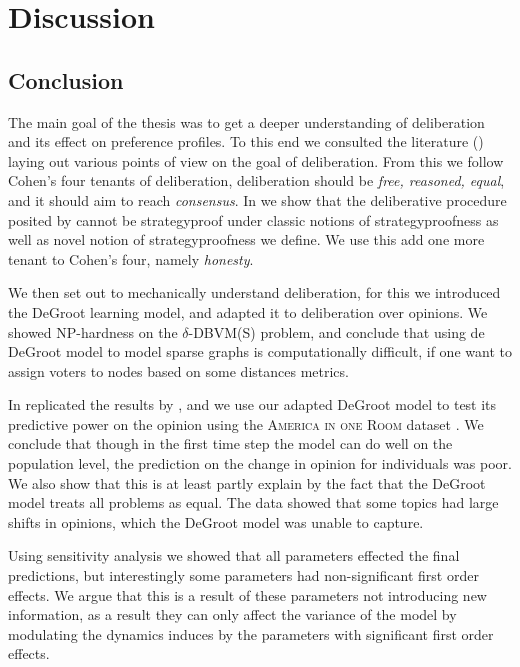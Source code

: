 \newpage
\chapter{Discussion}
\label{Discussion}

\section{Conclusion}

The main goal of the thesis was to get a deeper understanding of deliberation
and its effect on preference profiles. To this end we consulted the literature
() laying out various points of view on the goal of
deliberation. From this we follow Cohen's
\cite{cohenDeliberationDemocraticLegimitimacy2002} four tenants of
deliberation, deliberation should be \textit{free, reasoned, equal}, and  it
should aim to reach \textit{consensus}. In  we show that the
deliberative procedure posited by
\citet{radDeliberationSinglePeakednessCoherent2021} cannot be strategyproof
under classic notions of strategyproofness as well as novel notion of
strategyproofness we define. We use this add one more tenant to Cohen's four,
namely \textit{honesty}. 

We then set out to mechanically understand deliberation, for this we introduced
the DeGroot learning model, and adapted it to deliberation over opinions. We showed 
NP-hardness on the $\delta$-DBVM(S) problem, and conclude that using de DeGroot model 
to model sparse graphs is computationally difficult, if one want to assign voters to nodes
based on some distances metrics. 

In  replicated the results by
\citet{radDeliberationSinglePeakednessCoherent2021}, and we use our adapted
DeGroot model to test its predictive power on the opinion using the
\textsc{America in one Room} dataset \cite{fishkinCanDeliberationHave2024}. We
conclude that though in the first time step the model can do well on the
population level, the prediction on the change in opinion for individuals was
poor. We also show that this is at least partly explain by the fact that the
DeGroot model treats all problems as equal. The data showed that some topics
had large shifts in opinions, which the DeGroot model was unable to capture. 

Using sensitivity analysis we showed that all parameters effected the final
predictions, but interestingly some parameters had non-significant first order
effects. We argue that this is a result of these parameters not introducing new
information, as a result they can only affect the variance of the model by
modulating the dynamics induces by the parameters with significant first order
effects.

